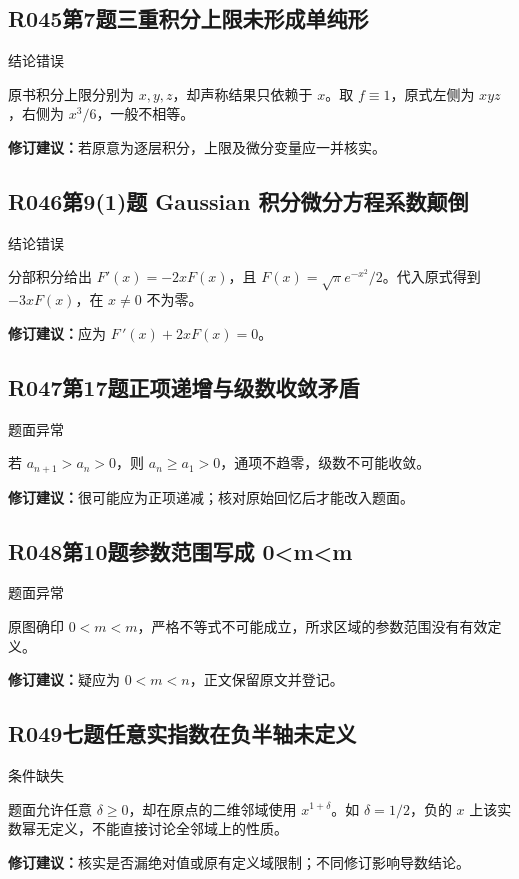 \subsection*{R045\quad 第7题三重积分上限未形成单纯形}
\noindent{}\quad 结论错误\par
原书积分上限分别为 $x,y,z$，却声称结果只依赖于 $x$。取 $f\equiv1$，原式左侧为 $xyz$，右侧为 $x^3/6$，一般不相等。
\par\textbf{修订建议：}若原意为逐层积分，上限及微分变量应一并核实。\par
{}
\subsection*{R046\quad 第9(1)题 Gaussian 积分微分方程系数颠倒}
\noindent{}\quad 结论错误\par
分部积分给出 $F'(x)=-2xF(x)$，且 $F(x)=\sqrt{\pi}e^{-x^2}/2$。代入原式得到 $-3xF(x)$，在 $x\ne0$ 不为零。
\par\textbf{修订建议：}应为 $F\,\prime(x)+2xF(x)=0$。\par
{}
\subsection*{R047\quad 第17题正项递增与级数收敛矛盾}
\noindent{}\quad 题面异常\par
若 $a_{n+1}>a_n>0$，则 $a_n\ge a_1>0$，通项不趋零，级数不可能收敛。
\par\textbf{修订建议：}很可能应为正项递减；核对原始回忆后才能改入题面。\par
{}
\subsection*{R048\quad 第10题参数范围写成 0<m<m}
\noindent{}\quad 题面异常\par
原图确印 $0<m<m$，严格不等式不可能成立，所求区域的参数范围没有有效定义。
\par\textbf{修订建议：}疑应为 $0<m<n$，正文保留原文并登记。\par
{}
\subsection*{R049\quad 七题任意实指数在负半轴未定义}
\noindent{}\quad 条件缺失\par
题面允许任意 $\delta\ge0$，却在原点的二维邻域使用 $x^{1+\delta}$。如 $\delta=1/2$，负的 $x$ 上该实数幂无定义，不能直接讨论全邻域上的性质。
\par\textbf{修订建议：}核实是否漏绝对值或原有定义域限制；不同修订影响导数结论。\par
{}
